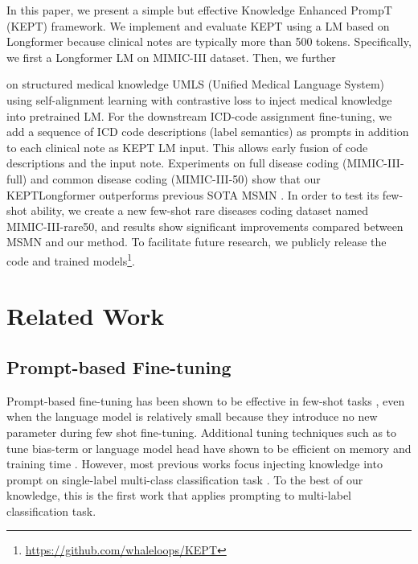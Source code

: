 \documentclass[11pt]{article}
\begin{document}
In this paper, we present a simple but effective Knowledge Enhanced PrompT (KEPT) framework. 
We implement and evaluate KEPT using a LM based on Longformer because clinical notes are typically more than 500 tokens. 
Specifically, we first 
a Longformer LM on MIMIC-III dataset. 
Then, we further
 
on structured medical knowledge UMLS (Unified Medical Language System) using self-alignment learning with contrastive loss to inject medical knowledge into pretrained LM. 
For the downstream ICD-code assignment fine-tuning, we add a sequence of ICD code descriptions (label semantics) as prompts in addition to each clinical note as KEPT LM input. This allows early fusion of code descriptions and the input note. 
Experiments on full disease coding (MIMIC-III-full) and common disease coding (MIMIC-III-50) show that our KEPTLongformer outperforms previous SOTA MSMN \citep{Yuan2022CodeSD}. In order to test its few-shot ability, we create a new few-shot rare diseases coding dataset named MIMIC-III-rare50, and results show significant improvements compared between MSMN and our method. To facilitate future research, we publicly release the code and trained models\footnote{\url{https://github.com/whaleloops/KEPT}}.


\section{Related Work}

\subsection{Prompt-based Fine-tuning}
Prompt-based fine-tuning has been shown to be effective in few-shot tasks \citep{le-scao-rush-2021-many, gao-etal-2021-making}, even when the language model is relatively small \citep{schick-schutze-2021-just} because they introduce no new parameter during few shot fine-tuning. 
Additional tuning techniques such as to tune bias-term or language model head have shown to be efficient on memory and training time \citep{ben-zaken-etal-2022-bitfit, logan-iv-etal-2022-cutting}. 
However, most previous works focus injecting knowledge into prompt on single-label multi-class classification task \citep{hu-etal-2022-knowledgeable, wang-etal-2022-automatic, Ye2022OntologyenhancedPF}. To the best of our knowledge, this is the first work that applies prompting to multi-label classification task.
\end{document}
